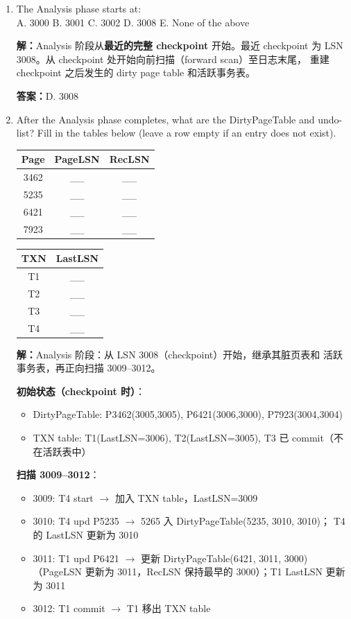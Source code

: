 \documentclass[11pt,a4paper]{article}
\newcommand{\solution}{\par\noindent\textcolor{ansblue}{\textbf{解：}}}
\newcommand{\answer}{\par\noindent\textcolor{ansred}{\textbf{答案：}}}
\begin{document}
\begin{enumerate}[leftmargin=*,itemsep=6pt]

\item The Analysis phase starts at:\\
  A. 3000 \quad B. 3001 \quad C. 3002 \quad D. 3008 \quad E. None of the above

  \solution Analysis 阶段从\textbf{最近的完整 checkpoint} 开始。最近 checkpoint
  为 LSN 3008。从 checkpoint 处开始向前扫描（forward scan）至日志末尾，
  重建 checkpoint 之后发生的 dirty page table 和活跃事务表。

  \answer \textcolor{ansred}{D. 3008}

\item After the Analysis phase completes, what are the DirtyPageTable and
  undo-list? Fill in the tables below (leave a row empty if an entry does not
  exist).

  {\small
  \begin{center}
  \begin{tabular}{c|c|c}
  Page & PageLSN & RecLSN \\
  \midrule
  3462 & \_\_ & \_\_ \\
  5235 & \_\_ & \_\_ \\
  6421 & \_\_ & \_\_ \\
  7923 & \_\_ & \_\_ \\
  \end{tabular}
  \qquad
  \begin{tabular}{c|c}
  TXN & LastLSN \\
  \midrule
  T1 & \_\_ \\
  T2 & \_\_ \\
  T3 & \_\_ \\
  T4 & \_\_ \\
  \end{tabular}
  \end{center}}

  \solution Analysis 阶段：从 LSN 3008（checkpoint）开始，继承其脏页表和
  活跃事务表，再正向扫描 3009--3012。

  \textbf{初始状态（checkpoint 时）}：
  \begin{itemize}[nosep]
    \item DirtyPageTable: P3462(3005,3005), P6421(3006,3000), P7923(3004,3004)
    \item TXN table: T1(LastLSN=3006), T2(LastLSN=3005), T3 已 commit（不在活跃表中）
  \end{itemize}

  \textbf{扫描 3009--3012}：
  \begin{itemize}[nosep]
    \item 3009: T4 start $\to$ 加入 TXN table，LastLSN=3009
    \item 3010: T4 upd P5235 $\to$ 5265 入 DirtyPageTable(5235, 3010, 3010)；
          T4 的 LastLSN 更新为 3010
    \item 3011: T1 upd P6421 $\to$ 更新 DirtyPageTable(6421, 3011, 3000)
          （PageLSN 更新为 3011，RecLSN 保持最早的 3000）；T1 LastLSN 更新为 3011
    \item 3012: T1 commit $\to$ T1 移出 TXN table
  \end{itemize}


\end{enumerate}
\end{document}
